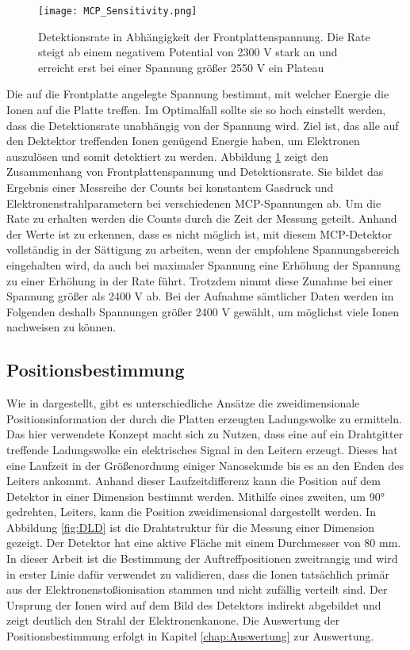 \begin{figure}
    \centering
    \texttt{[image: MCP\_Sensitivity.png]}
    \caption[Detektionsrate in Abhängigkeit der Frontplattenspannung]{Detektionsrate in Abhängigkeit der Frontplattenspannung. Die Rate steigt ab einem negativem Potential von 2300 V stark an und erreicht erst bei einer Spannung größer 2550 V ein Plateau}
    \label{fig:Frontplattenspannung}
\end{figure}

Die auf die Frontplatte angelegte Spannung bestimmt, mit welcher Energie die Ionen auf die Platte treffen. Im Optimalfall sollte sie so hoch einstellt werden, dass die Detektionsrate unabhängig von der Spannung wird. Ziel ist, das alle auf den Dektektor treffenden Ionen genügend Energie haben, um Elektronen auszulösen und somit detektiert zu werden. Abbildung \ref{fig:Frontplattenspannung} zeigt den Zusammenhang von Frontplattenspannung und Detektionsrate. Sie bildet das Ergebnis einer Messreihe der Counts bei konstantem Gasdruck und Elektronenstrahlparametern bei verschiedenen MCP-Spannungen ab. Um die Rate zu erhalten werden die Counts durch die Zeit der Messung geteilt. Anhand der Werte ist zu erkennen, dass es nicht möglich ist, mit diesem MCP-Detektor vollständig in der Sättigung zu arbeiten, wenn der empfohlene Spannungsbereich eingehalten wird, da auch bei maximaler Spannung eine Erhöhung der Spannung zu einer Erhöhung in der Rate führt. Trotzdem nimmt diese Zunahme bei einer Spannung größer als 2400 V ab. Bei der Aufnahme sämtlicher Daten werden im Folgenden deshalb Spannungen größer 2400 V gewählt, um möglichst viele Ionen nachweisen zu können.

\subsection{Positionsbestimmung}
Wie in \cite{Detektorsystem} dargestellt, gibt es unterschiedliche Ansätze die zweidimensionale Positionsinformation der durch die Platten erzeugten Ladungswolke zu ermitteln. Das hier verwendete Konzept macht sich zu Nutzen, dass eine auf ein Drahtgitter treffende Ladungswolke ein elektrisches Signal in den Leitern erzeugt. Dieses hat eine Laufzeit in der Größenordnung einiger Nanosekunde bis es an den Enden des Leiters ankommt. Anhand dieser Laufzeitdifferenz kann die Position auf dem Detektor in einer Dimension bestimmt werden. Mithilfe eines zweiten, um \ang{90} gedrehten, Leiters, kann die Position zweidimensional dargestellt werden. In Abbildung \ref{fig:DLD} ist die Drahtstruktur für die Messung einer Dimension gezeigt. Der Detektor hat eine aktive Fläche mit einem Durchmesser von 80 mm. In dieser Arbeit ist die Bestimmung der Auftreffpositionen zweitrangig und wird in erster Linie dafür verwendet zu validieren, dass die Ionen tatsächlich primär aus der Elektronenstoßionisation stammen und nicht zufällig verteilt sind. Der Ursprung der Ionen wird auf dem Bild des Detektors indirekt abgebildet und zeigt deutlich den Strahl der Elektronenkanone. Die Auswertung der Positionsbestimmung erfolgt in Kapitel \ref{chap:Auswertung} zur Auswertung.

